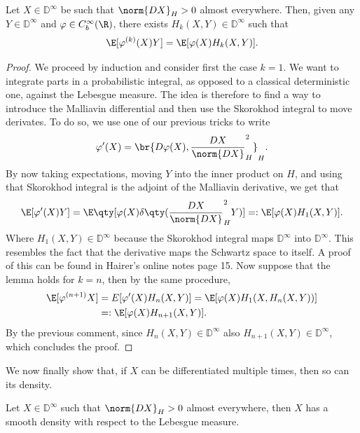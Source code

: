 \documentclass[
    a4paper,
    DIV=14,
    abstract=true,
    numbers=noenddot
]{scrartcl}
\begin{document}
	\begin{lemma} Let $X\in \mathbb{D}^{\infty}$ be such that $\norm{DX}_{H}>0$ almost everywhere. Then, given any $Y\in \mathbb{D}^\infty $ and $\varphi \in C_b^\infty(\R)$, there exists $H_{k}(X,Y)\in \mathbb{D}^\infty$ such that
		\begin{equation*}
			\E[\varphi^{(k)}(X)Y]=\E[\varphi(X)H_k(X,Y)].
		\end{equation*}
		\begin{proof}We proceed by induction and consider first the case $k=1$. We want to integrate parts in a probabilistic integral, as opposed to a classical deterministic one, against the Lebesgue measure. The idea is therefore to find a way to introduce the Malliavin differential and then use the Skorokhod integral to move derivates. To do so, we use one of our previous tricks to write
			\begin{equation*}
				\varphi'(X)=\br{D\varphi(X),\frac{DX}{\norm{DX}}_{H}^2}_{H}.
			\end{equation*}
			By now taking expectations, moving $Y$ into the inner product on  $H$, and using that Skorokhod integral is the adjoint of the Malliavin derivative, we get that
			\begin{equation*}
				\E[\varphi'(X)Y]=\E\qty[\varphi(X)\delta \qty(\frac{DX}{\norm{DX}}_{H}^2Y)]=:\E[\varphi(X)H_1(X,Y)].
			\end{equation*}
			Where  $H_1(X,Y)\in \mathbb{D}^\infty$ because the Skorokhod integral maps $\mathbb{D}^\infty$ into $\mathbb{D}^\infty$. This resembles the fact that the derivative maps the Schwartz space to itself. A proof of this can be found in Hairer's online notes \cite{hairer2021introduction} page 15. Now suppose that the lemma  holds for $k=n$, then by the same procedure,
			\begin{align*}
				\E[\varphi^{(n+1)}X] & =E[\varphi'(X)H_n(X,Y)]=\E[\varphi(X)H_1(X,H_n(X,Y))] \\&=:\E[\varphi(X)H_{n+1}(X,Y)].
			\end{align*}
			By the previous comment, since $H_n(X,Y)\in \mathbb{D}^\infty$ also $H_{n+1}(X,Y)\in \mathbb{D}^\infty$, which concludes the proof.
		\end{proof}

	\end{lemma}
	We now finally show that, if $X$ can be differentiated multiple times, then so can its density.
	\begin{theorem}
		Let $X\in \mathbb{D}^\infty$ such that  $\norm{DX}_{H}>0$ almost everywhere, then $X$ has a smooth density with respect to the Lebesgue measure.
	\end{theorem}
\end{document}
